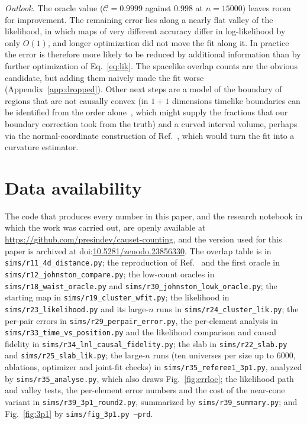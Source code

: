 \documentclass[prd,twocolumn,superscriptaddress,nofootinbib,amsmath,amssymb,floatfix]{revtex4-2}
\begin{document}
\emph{Outlook.} The oracle value ($\mathcal C=0.9999$ against $0.998$ at $n=15000$) leaves room for improvement. The remaining error lies along a nearly flat valley of the likelihood, in which maps of very different accuracy differ in log-likelihood by only $O(1)$, and longer optimization did not move the fit along it. In practice the error is therefore more likely to be reduced by additional information than by further optimization of Eq.~\eqref{eq:lik}. The spacelike overlap counts are the obvious candidate, but adding them naively made the fit worse (Appendix~\ref{app:dropped}). Other next steps are a model of the boundary of regions that are not causally convex (in $1+1$ dimensions timelike boundaries can be identified from the order alone~\cite{Cunningham18}, which might supply the fractions that our boundary correction took from the truth) and a curved interval volume, perhaps via the normal-coordinate construction of Ref.~\cite{Madsen26}, which would turn the fit into a curvature estimator.

\section*{Data availability}
The code that produces every number in this paper, and the research notebook in which the work was carried out, are openly available at \url{https://github.com/presindev/causet-counting}, and the version used for this paper is archived at doi:\href{https://doi.org/10.5281/zenodo.23856330}{10.5281/zenodo.23856330}. The overlap table is in \texttt{sims/r11\_4d\_distance.py}; the reproduction of Ref.~\cite{Johnston25} and the first oracle in \texttt{sims/r12\_johnston\_compare.py}; the low-count oracles in \texttt{sims/r18\_waist\_oracle.py} and \texttt{sims/r30\_johnston\_lowk\_oracle.py}; the starting map in \texttt{sims/r19\_cluster\_wfit.py}; the likelihood in \texttt{sims/r23\_likelihood.py} and its large-$n$ runs in \texttt{sims/r24\_cluster\_lik.py}; the per-pair errors in \texttt{sims/r29\_perpair\_error.py}, the per-element analysis in \texttt{sims/r33\_time\_vs\_position.py} and the likelihood comparison and causal fidelity in \texttt{sims/r34\_lnl\_causal\_fidelity.py}; the slab in \texttt{sims/r22\_slab.py} and \texttt{sims/r25\_slab\_lik.py}; the large-$n$ runs (ten universes per size up to $6000$, ablations, optimizer and joint-fit checks) in \texttt{sims/r35\_referee1\_3p1.py}, analyzed by \texttt{sims/r35\_analyse.py}, which also draws Fig.~\ref{fig:errloc}; the likelihood path and valley tests, the per-element error numbers and the cost of the near-cone variant in \texttt{sims/r39\_3p1\_round2.py}, summarized by \texttt{sims/r39\_summary.py}; and Fig.~\ref{fig:3p1} by \texttt{sims/fig\_3p1.py --prd}.
\end{document}
